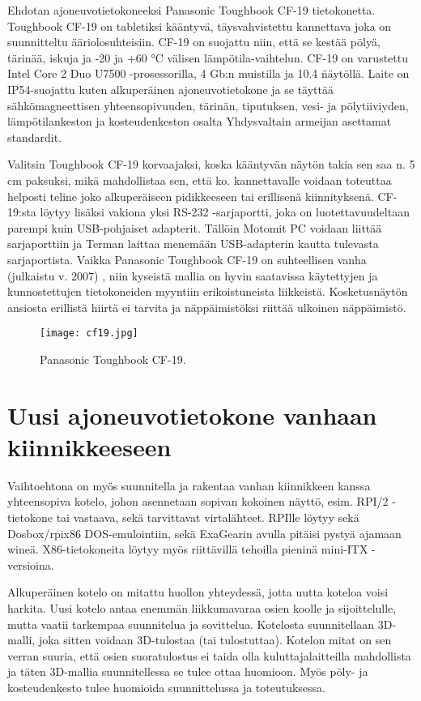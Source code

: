 Ehdotan ajoneuvotietokoneeksi Panasonic Toughbook CF-19 tietokonetta. Toughbook CF-19 on tabletiksi kääntyvä, täysvahvistettu kannettava joka on suunnitteltu ääriolosuhteisiin. CF-19 on suojattu niin, että se kestää pölyä, tärinää, iskuja ja -20 ja +60 °C välisen lämpötila-vaihtelun. CF-19 on varustettu Intel Core 2 Duo U7500 -prosessorilla, 4 Gb:n muistilla ja 10.4 \" näytöllä. Laite on IP54-suojattu kuten alkuperäinen ajoneuvotietokone ja se täyttää sähkömagneettisen yhteensopivuuden, tärinän, tiputuksen, vesi- ja pölytiiviyden, lämpötilankeston ja kosteudenkeston osalta Yhdysvaltain armeijan asettamat standardit. \cite{cf19}

Valitsin Toughbook CF-19 korvaajaksi, koska kääntyvän näytön takia sen saa n. 5 cm paksuksi, mikä mahdollistaa sen, että ko. kannettavalle voidaan toteuttaa helposti teline joko alkuperäiseen pidikkeeseen tai erillisenä kiinnityksenä. CF-19:sta löytyy lisäksi vakiona yksi RS-232 -sarjaportti, joka on luotettavuudeltaan parempi kuin USB-pohjaiset adapterit. Tällöin Motomit PC voidaan liittää sarjaporttiin ja Terman laittaa menemään USB-adapterin kautta tulevasta sarjaportista. Vaikka Panasonic Toughbook CF-19 on suhteellisen vanha (julkaistu v. 2007) \cite{cf19}, niin kyseistä mallia on hyvin saatavissa käytettyjen ja kunnostettujen tietokoneiden myyntiin erikoistuneista liikkeistä. Kosketusnäytön ansiosta erillistä hiirtä ei tarvita ja näppäimistöksi riittää ulkoinen näppäimistö.

\begin{figure}[H]
\centering
\texttt{[image: cf19.jpg]}
\caption{Panasonic Toughbook CF-19.}
\end{figure}

\section{Uusi ajoneuvotietokone vanhaan kiinnikkeeseen}

Vaihtoehtona on myös suunnitella ja rakentaa vanhan kiinnikkeen kanssa yhteensopiva kotelo, johon asennetaan sopivan kokoinen näyttö, esim. RPI/2 -tietokone tai vastaava, sekä tarvittavat virtalähteet. RPIlle löytyy sekä Dosbox/rpix86 DOS-emulointiin, sekä ExaGearin avulla pitäisi pystyä ajamaan wineä. X86-tietokoneita löytyy myös riittävillä tehoilla pieninä mini-ITX -versioina.

Alkuperäinen kotelo on mitattu huollon yhteydessä, jotta uutta koteloa voisi harkita. Uusi kotelo antaa enemmän liikkumavaraa osien koolle ja sijoittelulle, mutta vaatii tarkempaa suunnitelua ja sovittelua. Kotelosta suunnitellaan 3D-malli, joka sitten voidaan 3D-tulostaa (tai tulostuttaa). Kotelon mitat on sen verran suuria, että osien suoratulostus ei taida olla kuluttajalaitteilla mahdollista ja täten 3D-mallia suunnitellessa se tulee ottaa huomioon. Myös pöly- ja kosteudenkesto tulee huomioida suunnittelussa ja toteutuksessa.

